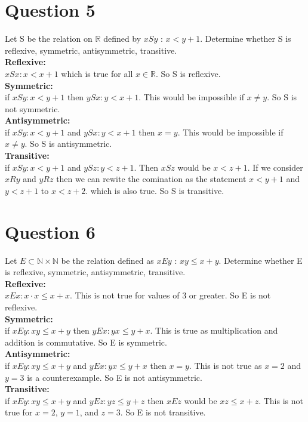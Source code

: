 \documentclass{article}
\begin{document}
\section*{Question 5}
Let S be the relation on $\mathbb{R}$ defined by $xSy$ : $ x<y+1$. Determine whether S is reflexive, symmetric, antisymmetric, transitive. \\
\textbf{Reflexive:}\\
$xSx : x < x+1$ which is true for all $x \in \mathbb{R}$. So S is reflexive.\\
\textbf{Symmetric:}\\
if $xSy : x < y+1$ then $ySx : y < x+1$. This would be impossible if $x \neq y$. So S is not symmetric.\\
\textbf{Antisymmetric:}\\
if $xSy : x < y+1$ and $ySx : y < x+1$ then $x=y$. This would be impossible if $x \neq y$. So S is antisymmetric.\\
\textbf{Transitive:}\\
if $xSy : x < y+1$ and $ySz : y < z+1$. Then $xSz$ would be $x < z+1$. If we consider $xRy$ and $yRz$ then we can rewite the comination as the statement $x < y+1$ and $y < z+1$ to $x < z+2$. which is also true. So S is transitive.\\
\section*{Question 6}
Let $E \subset \mathbb{N} \times \mathbb{N}$ be the relation defined as $xEy$ : $xy \leq x+y$. Determine whether E is reflexive, symmetric, antisymmetric, transitive.\\
\textbf{Reflexive:}\\
$xEx : x \cdot x \leq x + x$. This is not true for values of 3 or greater. So E is not reflexive.\\
\textbf{Symmetric:}\\
if $xEy : xy \leq x+y$ then $yEx : yx \leq y+x$. This is true as multiplication and addition is commutative. So E is symmetric.\\
\textbf{Antisymmetric:}\\
if $xEy : xy \leq x+y$ and $yEx : yx \leq y+x$ then $x=y$. This is not true as $x=2$ and $y=3$ is a counterexample. So E is not antisymmetric.\\
\textbf{Transitive:}\\
if $xEy : xy \leq x+y$ and $yEz : yz \leq y+z$ then $xEz$ would be $xz \leq x+z$. This is not true for $x=2$, $y=1$, and $z=3$. So E is not transitive.\\
\end{document}

